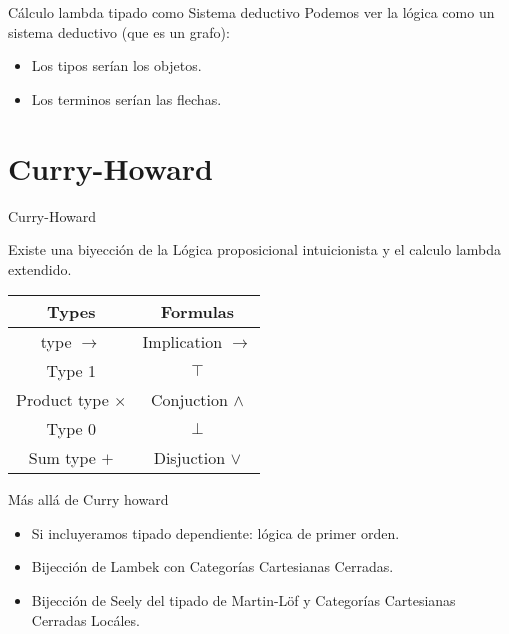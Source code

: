 \documentclass[usenames,dvipsnames]{beamer}
\begin{document}
\begin{frame}{Cálculo lambda tipado como Sistema deductivo}
  Podemos ver la lógica como un sistema deductivo (que es un grafo):
  \begin{itemize}
  \item Los tipos serían los objetos.
  \item Los terminos serían las flechas.
  \end{itemize}  
\end{frame}

\section{Curry-Howard}

\begin{frame}{Curry-Howard}

  Existe una biyección de la Lógica proposicional intuicionista y el calculo lambda extendido.
\begin{table}[!h]
\begin{center}
  \begin{tabular}{|c|c|}
  \hline
  Types  & Formulas  \\
  \hline
  type $\to$   & Implication $\to$  \\
  \hline 
  Type 1 & $\top$ \\
  Product type $\times$ & Conjuction $\land$ \\
  \hline
  Type 0 & $\bot$ \\
  Sum type $+$     & Disjuction $\lor$ \\
  \hline
\end{tabular}
\end{center}
\end{table}
  
\end{frame}

\begin{frame}{Más allá de Curry howard}
  \begin{itemize}
  \item Si incluyeramos tipado dependiente: lógica de primer orden.
  \item Bijección de Lambek con Categorías Cartesianas Cerradas.
  \item Bijección de Seely del tipado de Martin-Löf y Categorías Cartesianas Cerradas Locáles. 
  \end{itemize}
\end{frame}
\end{document}
